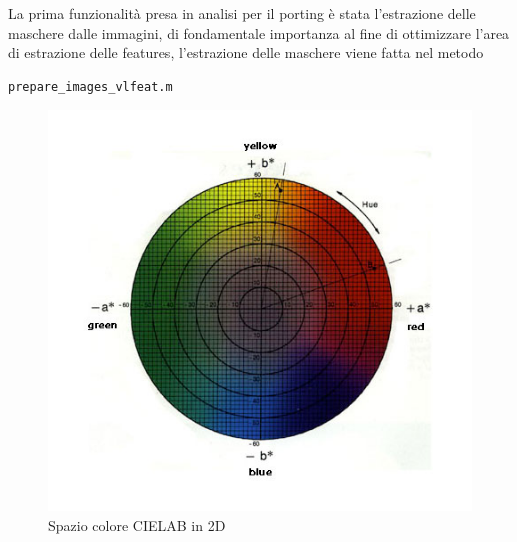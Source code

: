 \documentclass[a4paper,12pt]{report}
\begin{document}
      La prima funzionalità presa in analisi per il porting è stata l'estrazione delle maschere dalle immagini,
      di fondamentale importanza al fine di ottimizzare l'area di estrazione delle features, l'estrazione delle maschere viene fatta
      nel metodo 
      \begin{verbatim}
prepare_images_vlfeat.m
      \end{verbatim}
      \begin{figure}
        \centering
        
        \begin{minipage}{0.35\textwidth}
          \centering
          \includegraphics[width=\textwidth]{assets/images/methods/porting/cielab/cielab2.jpg}  
          \caption{Spazio colore CIELAB in 2D}
        \end{minipage}
        \begin{minipage}{0.35\textwidth}
          \centering

\end{minipage}
\end{figure}
\end{document}
